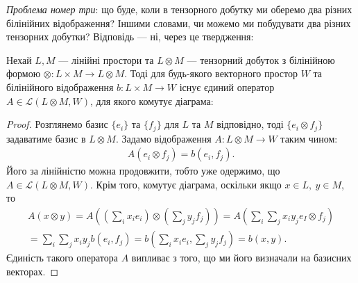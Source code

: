 \documentclass{math_library}
\begin{document}
\begin{remark}
\textit{Проблема номер три}: що буде, коли в тензорного добутку ми оберемо два різних білінійних відображення? Іншими словами, чи можемо ми побудувати два різних тензорних добутки? Відповідь --- ні, через це твердження:
\end{remark}

\begin{theorem}
Нехай $L,M$ --- лінійні простори та $L \otimes M$ --- тензорний добуток з білінійною формою $\otimes \colon L \times M \to L \otimes M$. Тоді для будь-якого векторного простор $W$ та білінійного відображення $b \colon L \times M \to W$ існує єдиний оператор $A \in \mathcal{L}(L \otimes M, W)$, для якого комутує діаграма:
\begin{figure}[H]
\centering
{}
\end{figure}
\end{theorem}

\begin{proof}
Розглянемо базис $\{e_i\}$ та $\{f_j\}$ для $L$ та $M$ відповідно, тоді $\{ e_i \otimes f_j \}$ задаватиме базис в $L \otimes M$. Задамо відображення $A \colon L \otimes M \to W$ таким чином:
\begin{align*}
A(e_i \otimes f_j) = b(e_i,f_j).
\end{align*}
Його за лінійністю можна продовжити, тобто уже одержимо, що $A \in \mathcal{L}(L \otimes M, W)$. Крім того, комутує діаграма, оскільки якщо $x \in L,\ y \in M$, то
\begin{align*}
A(x \otimes y) = A\left( \left( \sum_{i} x_i e_i  \right) \otimes \left( \sum_j y_j f_j \right) \right) = A\left( \sum_i \sum_j x_i y_j e_I \otimes f_j \right) \\
= \sum_i \sum_j x_i y_j b(e_i,f_j) = b\left( \sum_i x_i e_i, \sum_j y_j f_j \right) = b(x,y).
\end{align*}
Єдиність такого оператора $A$ випливає з того, що ми його визначали на базисних векторах.
\end{proof}
\end{document}
